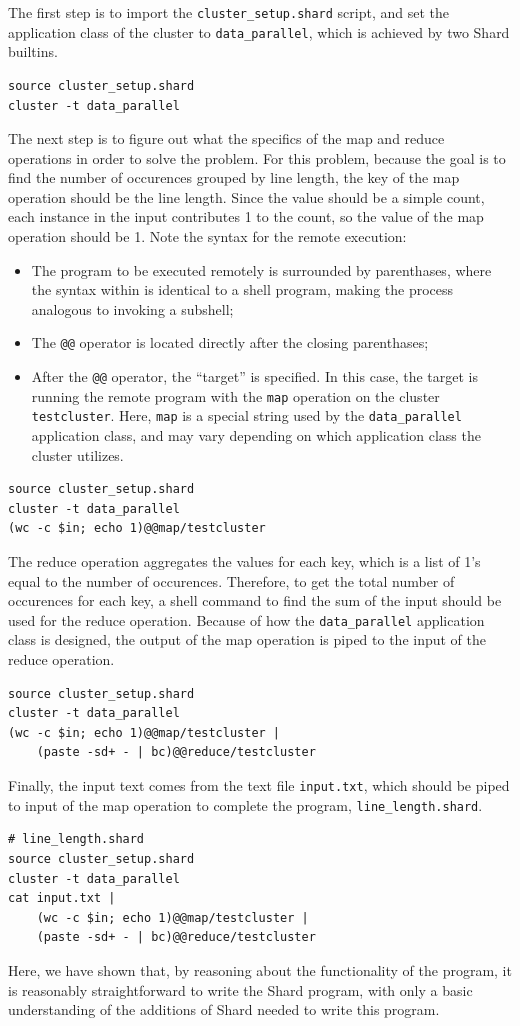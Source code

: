 \documentclass[twoside]{report}
\begin{document}
The first step is to import the \texttt{cluster\_setup.shard} script, and set the application class of the cluster to \texttt{data\_parallel}, which is achieved by two Shard builtins.
\begin{lstlisting}[language=Shard]
source cluster_setup.shard
cluster -t data_parallel
\end{lstlisting}
The next step is to figure out what the specifics of the map and reduce operations in order to solve the problem.
For this problem, because the goal is to find the number of occurences grouped by line length, the key of the map operation should be the line length.
Since the value should be a simple count, each instance in the input contributes 1 to the count, so the value of the map operation should be 1.
Note the syntax for the remote execution:
\begin{itemize}
  \item The program to be executed remotely is surrounded by parenthases, where the syntax within is identical to a shell program, making the process analogous to invoking a subshell;
  \item The \texttt{@@} operator is located directly after the closing parenthases;
  \item After the \texttt{@@} operator, the ``target'' is specified. In this case, the target is running the remote program with the \texttt{map} operation on the cluster \texttt{testcluster}. Here, \texttt{map} is a special string used by the \texttt{data\_parallel} application class, and may vary depending on which application class the cluster utilizes.
\end{itemize}
\begin{lstlisting}[language=Shard]
source cluster_setup.shard
cluster -t data_parallel
(wc -c $in; echo 1)@@map/testcluster
\end{lstlisting}
The reduce operation aggregates the values for each key, which is a list of 1's equal to the number of occurences.
Therefore, to get the total number of occurences for each key, a shell command to find the sum of the input should be used for the reduce operation.
Because of how the \texttt{data\_parallel} application class is designed, the output of the map operation is piped to the input of the reduce operation.
\begin{lstlisting}[language=Shard]
source cluster_setup.shard
cluster -t data_parallel
(wc -c $in; echo 1)@@map/testcluster |
    (paste -sd+ - | bc)@@reduce/testcluster
\end{lstlisting}
Finally, the input text comes from the text file \texttt{input.txt}, which should be piped to input of the map operation to complete the program, \texttt{line\_length.shard}.
\begin{lstlisting}[language=Shard]
# line_length.shard
source cluster_setup.shard
cluster -t data_parallel
cat input.txt |
    (wc -c $in; echo 1)@@map/testcluster |
    (paste -sd+ - | bc)@@reduce/testcluster
\end{lstlisting}
Here, we have shown that, by reasoning about the functionality of the program, it is reasonably straightforward to write the Shard program, with only a basic understanding of the additions of Shard needed to write this program.
\end{document}
